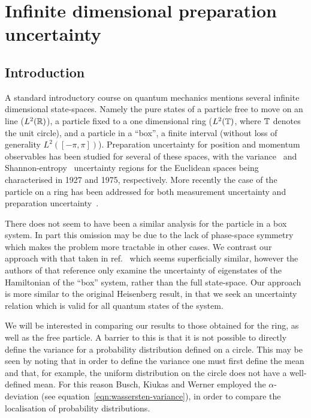 \chapter{Infinite dimensional preparation uncertainty}\label{chap:infinite-prep-ur}
\section{Introduction}
A standard introductory course on quantum mechanics mentions several infinite dimensional state-spaces. Namely the pure states of a particle free to move on an line ($L^2(\mathbb{R})$), a particle fixed to a one dimensional ring ($L^2(\mathbb{T})$, where $\mathbb{T}$ denotes the unit circle), and a particle in a ``box'', a finite interval (without loss of generality $L^2([-\pi, \pi])$). Preparation uncertainty for position and momentum observables has been studied for several of these spaces, with the variance~\cite{Heisenberg1927-Wheeler+Zurek} and Shannon-entropy~\cites{Bialynicki-BirulaMycielski1975}{beckner-1975} uncertainty regions for the Euclidean spaces being characterised in 1927 and 1975, respectively. More recently the case of the particle on a ring has been addressed for both measurement uncertainty and preparation uncertainty~\cite{sharp-ur-num-angle}. 

There does not seem to have been a similar analysis for the particle in a box system. In part this omission may be due to the lack of phase-space symmetry which makes the problem more tractable in other cases. We contrast our approach with that taken in ref.~\cite{entropic-ur-infinite-well} which seems superficially similar, however the authors of that reference only examine the uncertainty of eigenstates of the Hamiltonian of the ``box'' system, rather than the full state-space. Our approach is more similar to the original Heisenberg result, in that we seek an uncertainty relation which is valid for all quantum states of the system.

We will be interested in comparing our results to those obtained for the ring, as well as the free particle. A barrier to this is that it is not possible to directly define the variance for a probability distribution defined on a circle. This may be seen by noting that in order to define the variance one must first define the mean and that, for example, the uniform distribution on the circle does not have a well-defined mean. For this reason Busch, Kiukas and Werner employed the  $\alpha$-deviation (see equation~\eqref{eqn:wassersten-variance}), in order to compare the localisation of probability distributions. 


